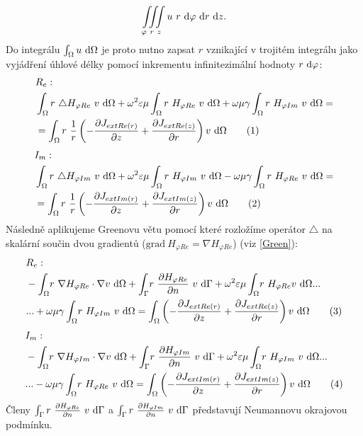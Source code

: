 \documentclass[12pt,a4paper,oneside]{article}
\numberwithin{equation}{section} %
\numberwithin{figure}{section} %
\numberwithin{table}{section} %
\newcommand{\grad}{\mathrm{grad}\ }
\newcommand\numberthis{\addtocounter{equation}{1}\tag{\theequation}}
\begin{document}
\begin{equation}
\iiint \limits_{\varphi ~ r ~ z} u ~ r ~ \mathrm{d} \varphi ~ \mathrm{d} r ~ \mathrm{d} z . 
\end{equation}
Do integrálu $\int _{\Omega} u ~ \mathrm{d} \Omega$ je proto nutno zapsat $r$ vznikající v trojitém integrálu jako vyjádření úhlové délky pomocí inkrementu infinitezimální hodnoty $r ~ \mathrm{d} \varphi$:
\begin{align*}
&R_e:
\\
&\int _{\Omega} r ~ \triangle H _{\varphi Re} ~ v ~ \ud \Omega + \omega ^2 \varepsilon \mu \int _{\Omega} r ~ H _{\varphi Re} ~ v ~ \ud \Omega + \omega \mu \gamma \int _{\Omega} r ~ H _{\varphi Im} ~ v ~ \ud \Omega = 
\\
&= \int _{\Omega} r ~ \frac{1}{r} \left( - \frac{\partial J _{extRe(r)}}{\partial z} + \frac{\partial J _{extRe(z)}}{\partial r} \right) v ~ \ud \Omega
\numberthis
\end{align*}
\begin{align*}
&I_m:
\\
&\int _{\Omega} r ~ \triangle H _{\varphi Im} ~ v ~ \ud \Omega + \omega ^2 \varepsilon \mu \int _{\Omega} r ~ H _{\varphi Im} ~ v ~ \ud \Omega - \omega \mu \gamma \int _{\Omega} r ~ H _{\varphi Re} ~ v ~ \ud \Omega = 
\\
&= \int _{\Omega} r ~ \frac{1}{r} \left( - \frac{\partial J _{extIm(r)}}{\partial z} + \frac{\partial J _{extIm(z)}}{\partial r} \right) v ~ \ud \Omega
\numberthis
\end{align*}
Následně aplikujeme Greenovu větu pomocí které rozložíme operátor $\triangle$ na skalární součin dvou gradientů ($\grad H _{\varphi Re} = \nabla H _{\varphi Re}$) (viz \ref{Green}):
\begin{align*}
&R_e:
\\
&- \int _{\Omega} \! r ~ \nabla H _{\varphi Re} \cdot \nabla v ~ \ud \Omega + \int _{\Gamma} \! r ~ \frac{\partial H _{\varphi Re}}{\partial n} ~ v ~ \ud \Gamma + \omega ^2 \varepsilon \mu \int _{\Omega} \! r ~ H _{\varphi Re} v ~ \ud \Omega...\\
&... + \omega \mu \gamma \int _{\Omega} \! r ~ H _{\varphi Im} ~ v ~ \ud \Omega = \int _{\Omega} \left( - \frac{\partial J _{extRe(r)}}{\partial z} + \frac{\partial J _{extRe(z)}}{\partial r} \right) v ~ \ud \Omega
\numberthis
\end{align*}
\begin{align*}
&I_m:
\\
&- \int _{\Omega} \! r ~ \nabla H _{\varphi Im} \cdot \nabla v ~ \ud \Omega + \int _{\Gamma} \! r ~ \frac{\partial H _{\varphi Im}}{\partial n} ~ v ~ \ud \Gamma + \omega ^2 \varepsilon \mu \int _{\Omega} \! r ~ H _{\varphi Im} ~ v ~ \ud \Omega...\\
&... - \omega \mu \gamma \int _{\Omega} \! r ~ H _{\varphi Re} ~ v ~ \ud \Omega = \int _{\Omega} \left( - \frac{\partial J _{extIm(r)}}{\partial z} + \frac{\partial J _{extIm(z)}}{\partial r} \right) v ~ \ud \Omega
\numberthis
\end{align*}
Členy $\int _{\Gamma} r ~ \frac{\partial H _{\varphi Re}}{\partial n} ~ v ~ \mathrm{d} \Gamma$ a $\int _{\Gamma} r ~ \frac{\partial H _{\varphi Im}}{\partial n} ~ v ~ \mathrm{d} \Gamma$ představují Neumannovu okrajovou podmínku.
\end{document}

